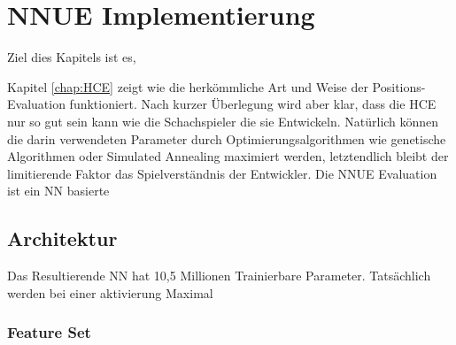 \chapter{NNUE Implementierung}

Ziel dies Kapitels ist es, 

Kapitel \autoref{chap:HCE} zeigt wie die herkömmliche Art und Weise der Positions-Evaluation funktioniert. Nach kurzer Überlegung wird aber klar, dass die \ac{HCE} nur so gut sein kann wie die Schachspieler die sie Entwickeln. Natürlich können die darin verwendeten Parameter durch Optimierungsalgorithmen wie genetische Algorithmen oder Simulated Annealing maximiert werden, letztendlich bleibt der limitierende Faktor das Spielverständnis der Entwickler. Die \ac{NNUE} Evaluation ist ein \ac{NN} basierte 


\section{Architektur}


Das Resultierende \ac{NN} hat 10,5 Millionen Trainierbare Parameter. Tatsächlich werden bei einer aktivierung Maximal 


\subsection{Feature Set}
\label{chap:featureSet}



